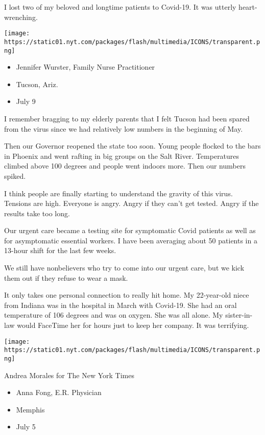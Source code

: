 I lost two of my beloved and longtime patients to Covid-19. It was
utterly heart-wrenching.

\texttt{[image: https://static01.nyt.com/packages/flash/multimedia/ICONS/transparent.png]}

\begin{itemize}
\tightlist
\item
  Jennifer Wurster, Family Nurse Practitioner
\item
  Tucson, Ariz.
\item
  July 9
\end{itemize}

I remember bragging to my elderly parents that I felt Tucson had been
spared from the virus since we had relatively low numbers in the
beginning of May.

Then our Governor reopened the state too soon. Young people flocked to
the bars in Phoenix and went rafting in big groups on the Salt River.
Temperatures climbed above 100 degrees and people went indoors more.
Then our numbers spiked.

I think people are finally starting to understand the gravity of this
virus. Tensions are high. Everyone is angry. Angry if they can't get
tested. Angry if the results take too long.

Our urgent care became a testing site for symptomatic Covid patients as
well as for asymptomatic essential workers. I have been averaging about
50 patients in a 13-hour shift for the last few weeks.

We still have nonbelievers who try to come into our urgent care, but we
kick them out if they refuse to wear a mask.

It only takes one personal connection to really hit home. My 22-year-old
niece from Indiana was in the hospital in March with Covid-19. She had
an oral temperature of 106 degrees and was on oxygen. She was all alone.
My sister-in-law would FaceTime her for hours just to keep her company.
It was terrifying.

\texttt{[image: https://static01.nyt.com/packages/flash/multimedia/ICONS/transparent.png]}

Andrea Morales for The New York Times

\begin{itemize}
\tightlist
\item
  Anna Fong, E.R. Physician
\item
  Memphis
\item
  July 5
\end{itemize}

